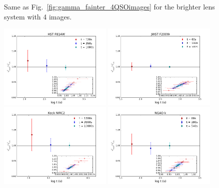 \documentclass[a4paper,11pt]{article}
\begin{document}
{\begin{figure}
\begin{center}
\end{center}
\caption{Same as Fig.~\ref{fig:gamma_fainter_4QSOimages} for the brighter lens system with 4 images.
\label{fig:gamma_brighter_4QSOimages}}
\end{figure}

\begin{figure}
\begin{center}
\includegraphics[width=0.48\textwidth]{figures/gamma_0330_2QSOimages_HST.png}
\includegraphics[width=0.48\textwidth]{figures/gamma_0330_2QSOimages_JWST.png} \\
\includegraphics[width=0.48\textwidth]{figures/gamma_0330_2QSOimages_Keck.png}
\includegraphics[width=0.48\textwidth]{figures/gamma_0330_2QSOimages_NGAO.png} \\

\end{center}
\end{figure}}
\end{document}

